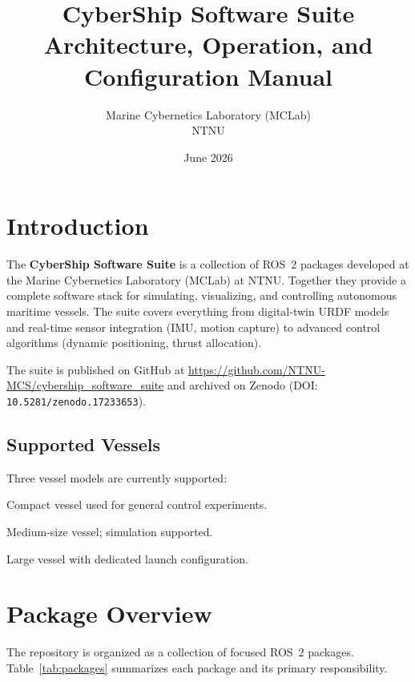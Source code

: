 \documentclass[12pt,a4paper]{article}
\title{
	\vspace{-1cm}
	\textbf{CyberShip Software Suite}\\[0.5em]
	\large Architecture, Operation, and Configuration Manual
}
\author{Marine Cybernetics Laboratory (MCLab)\\NTNU}
\date{June 2026}
\begin{document}
	
	\maketitle
	\thispagestyle{fancy}
	
	\tableofcontents
	\newpage
	
	\section{Introduction}
	\label{sec:intro}
	
	The \textbf{CyberShip Software Suite} is a collection of ROS~2 packages developed at the Marine
	Cybernetics Laboratory (MCLab) at NTNU. Together they provide a complete software stack for
	simulating, visualizing, and controlling autonomous maritime vessels. The suite covers everything
	from digital-twin URDF models and real-time sensor integration (IMU, motion capture) to advanced
	control algorithms (dynamic positioning, thrust allocation).
	
	The suite is published on GitHub at
	\url{https://github.com/NTNU-MCS/cybership_software_suite} and archived on Zenodo
	(DOI: \texttt{10.5281/zenodo.17233653}).
	
	\subsection{Supported Vessels}
	
	Three vessel models are currently supported:
	
	\begin{description}[leftmargin=3cm, style=nextline]
		\item[Voyager] Compact vessel used for general control experiments.
		\item[Enterprise] Medium-size vessel; simulation supported.
		\item[Drillship] Large vessel with dedicated launch configuration.
	\end{description}
	
	\section{Package Overview}
	\label{sec:packages}
	
	The repository is organized as a collection of focused ROS~2 packages. Table~\ref{tab:packages}
	summarizes each package and its primary responsibility.
	
\end{document}
